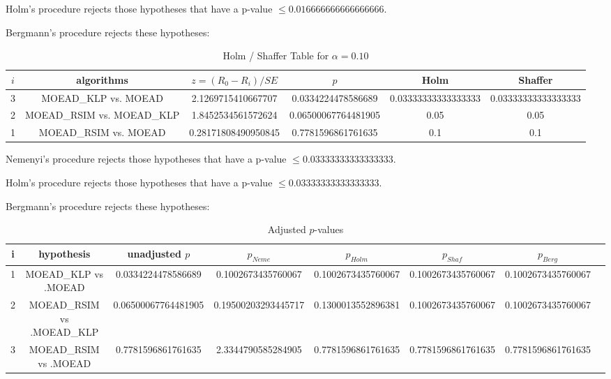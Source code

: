 \documentclass[a4paper,10pt]{article}
\begin{document}
\begin{landscape}
Holm's procedure rejects those hypotheses that have a p-value $\le0.016666666666666666$.


Bergmann's procedure rejects these hypotheses:


\begin{itemize}


\end{itemize}


\begin{table}[!htp]
\centering\tiny
\caption{Holm / Shaffer Table for $\alpha=0.10$}
\begin{tabular}{cccccc}
$i$&algorithms&$z=(R_0 - R_i)/SE$&$p$&Holm&Shaffer\\
\hline
3&MOEAD_KLP vs. MOEAD&2.1269715410667707&0.0334224478586689&0.03333333333333333&0.03333333333333333\\
2&MOEAD_RSIM vs. MOEAD_KLP&1.8452534561572624&0.06500067764481905&0.05&0.05\\
1&MOEAD_RSIM vs. MOEAD&0.28171808490950845&0.7781596861761635&0.1&0.1\\
\hline
\end{tabular}
\end{table}
Nemenyi's procedure rejects those hypotheses that have a p-value $\le0.03333333333333333$.


Holm's procedure rejects those hypotheses that have a p-value $\le0.03333333333333333$.


Bergmann's procedure rejects these hypotheses:


\begin{itemize}


\end{itemize}


\begin{table}[!htp]
\centering\tiny
\caption{Adjusted $p$-values}
\begin{tabular}{cccccccc}
i&hypothesis&unadjusted $p$&$p_{Neme}$&$p_{Holm}$&$p_{Shaf}$&$p_{Berg}$\\
\hline
1&MOEAD_KLP vs .MOEAD&0.0334224478586689&0.1002673435760067&0.1002673435760067&0.1002673435760067&0.1002673435760067\\
2&MOEAD_RSIM vs .MOEAD_KLP&0.06500067764481905&0.19500203293445717&0.1300013552896381&0.1002673435760067&0.1002673435760067\\
3&MOEAD_RSIM vs .MOEAD&0.7781596861761635&2.3344790585284905&0.7781596861761635&0.7781596861761635&0.7781596861761635\\
\hline
\end{tabular}
\end{table}

\end{landscape}
\end{document}
